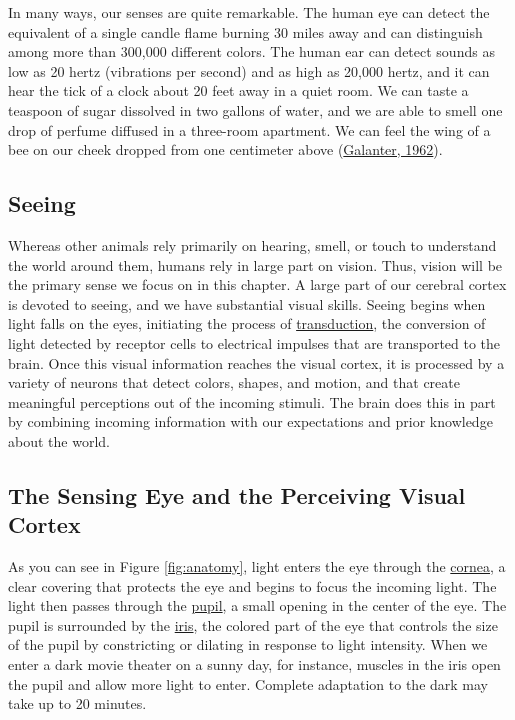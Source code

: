 \documentclass[
]{krantz}
\begin{document}
In many ways, our senses are quite remarkable. The human eye can detect the equivalent of a single candle flame burning 30 miles away and can distinguish among more than 300,000 different colors. The human ear can detect sounds as low as 20 hertz (vibrations per second) and as high as 20,000 hertz, and it can hear the tick of a clock about 20 feet away in a quiet room. We can taste a teaspoon of sugar dissolved in two gallons of water, and we are able to smell one drop of perfume diffused in a three-room apartment. We can feel the wing of a bee on our cheek dropped from one centimeter above (\protect\hyperlink{ref-Galanter1962}{Galanter, 1962}).

\hypertarget{seeing}{%
\subsection*{Seeing}\label{seeing}}


Whereas other animals rely primarily on hearing, smell, or touch to understand the world around them, humans rely in large part on vision. Thus, vision will be the primary sense we focus on in this chapter. A large part of our cerebral cortex is devoted to seeing, and we have substantial visual skills. Seeing begins when light falls on the eyes, initiating the process of \protect\hyperlink{transduction}{transduction}, the conversion of light detected by receptor cells to electrical impulses that are transported to the brain. Once this visual information reaches the visual cortex, it is processed by a variety of neurons that detect colors, shapes, and motion, and that create meaningful perceptions out of the incoming stimuli. The brain does this in part by combining incoming information with our expectations and prior knowledge about the world.

\hypertarget{the-sensing-eye-and-the-perceiving-visual-cortex}{%
\subsection*{The Sensing Eye and the Perceiving Visual Cortex}\label{the-sensing-eye-and-the-perceiving-visual-cortex}}


As you can see in Figure \ref{fig:anatomy}, light enters the eye through the \protect\hyperlink{cornea}{cornea}, a clear covering that protects the eye and begins to focus the incoming light. The light then passes through the \protect\hyperlink{pupil}{pupil}, a small opening in the center of the eye. The pupil is surrounded by the \protect\hyperlink{iris}{iris}, the colored part of the eye that controls the size of the pupil by constricting or dilating in response to light intensity. When we enter a dark movie theater on a sunny day, for instance, muscles in the iris open the pupil and allow more light to enter. Complete adaptation to the dark may take up to 20 minutes.
\end{document}
